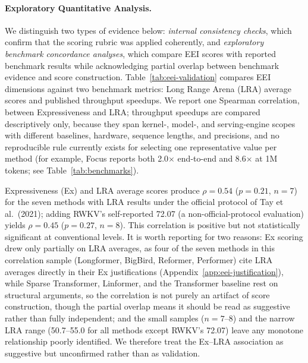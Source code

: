 \documentclass[10pt,twocolumn]{article}
\begin{document}
\paragraph{Exploratory Quantitative Analysis.}
We distinguish two types of evidence below: \textit{internal consistency checks}, which confirm that the scoring rubric was applied coherently, and \textit{exploratory benchmark concordance analyses}, which compare EEI scores with reported benchmark results while acknowledging partial overlap between benchmark evidence and score construction. Table~\ref{tab:eei-validation} compares EEI dimensions against two benchmark metrics: Long Range Arena (LRA) average scores and published throughput speedups. We report one Spearman correlation, between Expressiveness and LRA; throughput speedups are compared descriptively only, because they span kernel-, model-, and serving-engine scopes with different baselines, hardware, sequence lengths, and precisions, and no reproducible rule currently exists for selecting one representative value per method (for example, Focus reports both 2.0$\times$ end-to-end and 8.6$\times$ at 1M tokens; see Table~\ref{tab:benchmarks}).

Expressiveness (Ex) and LRA average scores produce $\rho = 0.54$ ($p = 0.21$, $n = 7$) for the seven methods with LRA results under the official protocol of Tay et al.\ (2021); adding RWKV's self-reported 72.07 (a non-official-protocol evaluation) yields $\rho = 0.45$ ($p = 0.27$, $n = 8$). This correlation is positive but not statistically significant at conventional levels. It is worth reporting for two reasons: Ex scoring drew only partially on LRA averages, as four of the seven methods in this correlation sample (Longformer, BigBird, Reformer, Performer) cite LRA averages directly in their Ex justifications (Appendix~\ref{app:eei-justification}), while Sparse Transformer, Linformer, and the Transformer baseline rest on structural arguments, so the correlation is not purely an artifact of score construction, though the partial overlap means it should be read as suggestive rather than fully independent; and the small samples ($n = 7$--$8$) and the narrow LRA range (50.7--55.0 for all methods except RWKV's 72.07) leave any monotone relationship poorly identified. We therefore treat the Ex--LRA association as suggestive but unconfirmed rather than as validation.
\end{document}
